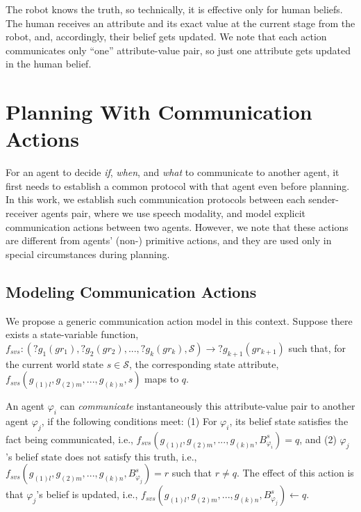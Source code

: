 \documentclass[letterpaper]{article} %
\begin{document}
The robot knows the truth, so technically, it is effective only for human beliefs.
The human receives an attribute and its exact value at the current stage from the robot, and, accordingly, their belief gets updated. 
We note that each action communicates only ``one'' attribute-value pair, so just one attribute gets updated in the human belief.


\section{Planning With Communication Actions}
For an agent to decide \textit{if}, \textit{when}, and \textit{what} to communicate to another agent, it first needs to establish a common protocol with that agent even before planning.  
In this work, we establish such communication protocols between each sender-receiver agents pair, where we use speech modality, and model explicit communication actions between two agents. 
However, we note that these actions are different from agents' (non-) primitive actions, and they are used only in special circumstances during planning.

\subsection{Modeling Communication Actions} 
We propose a generic communication action model in this context. 
% 
Suppose there exists a state-variable function, $f_{svs}:(?g_1 (gr_1), ?g_2 (gr_2), ..., ?g_k (gr_k),\mathcal{S}) \rightarrow ?g_{k+1} (gr_{k+1})$ such that,
for the current world state $s \in \mathcal{S}$, the corresponding state attribute, $f_{\textit{svs}}(g_{(1)l},g_{(2)m},...,g_{(k)n},s)$ maps to $q$.

An agent $\varphi_i$ can \textit{communicate} instantaneously this attribute-value pair to another agent $\varphi_j$, if the following conditions meet: 
(1) For $\varphi_i$, its belief state satisfies the fact being communicated, i.e.,
$f_{\textit{svs}}(g_{(1)l},g_{(2)m},...,g_{(k)n},B_{\varphi_i}^s) = q$, and (2) $\varphi_j$'s belief state does not satisfy this truth, i.e., $f_{\textit{svs}}(g_{(1)l},g_{(2)m},...,g_{(k)n},B_{\varphi_j}^s) = r$ such that $r \neq q$.
The effect of this action is that  
$\varphi_j$'s belief is updated, i.e., $f_{\textit{svs}}(g_{(1)l},g_{(2)m},...,g_{(k)n},B_{\varphi_j}^s) \leftarrow q$. 
\end{document}
